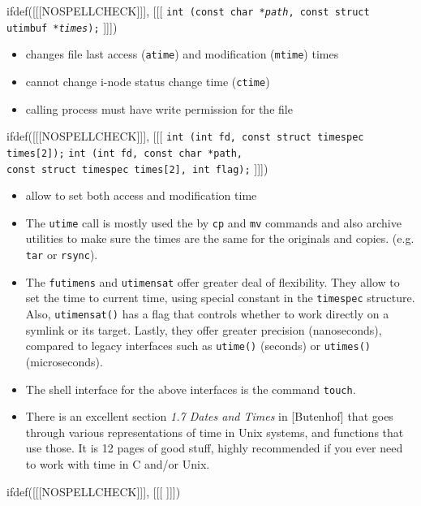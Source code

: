 \begin{slide}
ifdef([[[NOSPELLCHECK]]], [[[
\texttt{int (const char *\emph{path},
const struct utimbuf *\emph{times});}
]]])
\begin{itemize}
\item changes file last access (\texttt{atime}) and modification
(\texttt{mtime}) times
\item cannot change i-node status change time (\texttt{ctime})
\item calling process must have write permission for the file
\end{itemize}
ifdef([[[NOSPELLCHECK]]], [[[
\texttt{int (int fd, const struct timespec times[2]);}
\texttt{int (int fd, const char *path, \\
const struct timespec times[2], int flag);}
]]])
\begin{itemize}
\item allow to set both access and modification time
\end{itemize}
\end{slide}

\begin{itemize}
\item The \texttt{utime} call is mostly used the by \texttt{cp} and \texttt{mv}
commands and also archive utilities to make sure the times are the same for the
originals and copies. (e.g. \texttt{tar} or \texttt{rsync}).
\item The \texttt{futimens} and \texttt{utimensat} offer greater deal of
flexibility. They allow to set the time to current time, using special
constant in the \texttt{timespec} structure. Also, \texttt{utimensat()}
has a flag that controls whether to work directly on a symlink or its target.
Lastly, they offer greater precision (nanoseconds), compared to legacy
interfaces such as \texttt{utime()} (seconds) or \texttt{utimes()}
(microseconds).
\item The shell interface for the above interfaces is the command \texttt{touch}.
\item There is an excellent section \emph{1.7 Dates and Times} in [Butenhof]
that goes through various representations of time in Unix systems, and functions
that use those.  It is 12 pages of good stuff, highly recommended if you ever
need to work with time in C and/or Unix.
\end{itemize}


ifdef([[[NOSPELLCHECK]]], [[[
]]])

